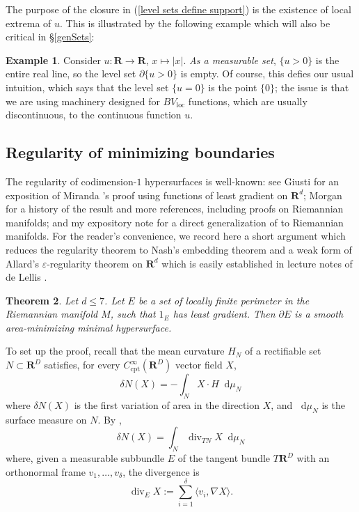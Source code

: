 \documentclass[reqno,11pt]{amsart}
\newcommand{\RR}{\mathbf{R}}
\newcommand*\dif{\mathop{}\!\mathrm{d}}
\DeclareMathOperator{\Div}{div}
\newcommand{\loc}{\mathrm{loc}}
\newcommand{\cpt}{\mathrm{cpt}}
\newtheorem{theorem}{Theorem}[section]
\theoremstyle{definition}
\newtheorem{example}[theorem]{Example}
\numberwithin{equation}{section}
\begin{document}
The purpose of the closure in (\ref{level sets define support}) is the existence of local extrema of $u$.
This is illustrated by the following example which will also be critical in \S\ref{genSets}:

\begin{example}
Consider $u: \RR \to \RR$, $x \mapsto |x|$.
\emph{As a measurable set}, $\{u > 0\}$ is the entire real line, so the level set $\partial \{u > 0\}$ is empty.
Of course, this defies our usual intuition, which says that the level set $\{u = 0\}$ is the point $\{0\}$; the issue is that we are using machinery designed for $BV_\loc$ functions, which are usually discontinuous, to the continuous function $u$.
\end{example}

\subsection{Regularity of minimizing boundaries}
The regularity of codimension-$1$ hypersurfaces is well-known: see Giusti \cite[Theorem 10.11]{Giusti77} for an exposition of Miranda \cite{Miranda66}'s proof using functions of least gradient on $\RR^d$; Morgan \cite[Chapter 8]{Morgan88} for a history of the result and more references, including proofs on Riemannian manifolds; and my expository note \cite{BackusFLG} for a direct generalization of \cite{Miranda66} to Riemannian manifolds.
For the reader's convenience, we record here a short argument which reduces the regularity theorem to Nash's embedding theorem and a weak form of Allard's $\varepsilon$-regularity theorem on $\RR^d$ which is easily established in lecture notes of de Lellis \cite[Theorem 3.2]{DeLellis18}.

\begin{theorem}\label{regularity}
Let $d \leq 7$. Let $E$ be a set of locally finite perimeter in the Riemannian manifold $M$, such that $1_E$ has least gradient.
Then $\partial E$ is a smooth area-minimizing minimal hypersurface.
\end{theorem}

To set up the proof, recall that the mean curvature $H_N$ of a rectifiable set $N \subset \RR^D$ satisfies, for every $C^\infty_\cpt(\RR^D)$ vector field $X$,
$$\delta N(X) = -\int_N X \cdot H \dif \mu_N$$
where $\delta N(X)$ is the first variation of area in the direction $X$, and $\dif \mu_N$ is the surface measure on $N$.
By \cite[Proposition 1.5]{DeLellis18}, 
$$\delta N(X) = \int_N \Div_{TN} X \dif \mu_N$$
where, given a measurable subbundle $E$ of the tangent bundle $T\RR^D$ with an orthonormal frame $v_1, \dots, v_\delta$, the divergence is 
$$\Div_E X := \sum_{i = 1}^\delta \langle v_i, \nabla X\rangle.$$
\end{document}
